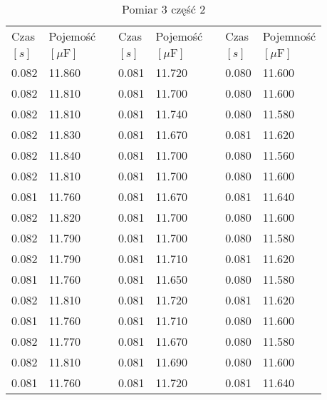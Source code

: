 \documentclass[12pt]{mwrep}
\begin{document}
	\begin{table}[H]\caption{Pomiar 3 część 2}\label{tab:3v2}
		\begin{tabularx}{\textwidth}{|Y|Y|p{2mm}|Y|Y|p{2mm}|Y|Y|}
			Czas & Pojemość && Czas & Pojemość && Czas & Pojemność \\
			$[s]$ & $[\mu\text{F}]$ && $[s]$ & $[\mu\text{F}]$ && $[s]$ & $[\mu\text{F}]$ \\
			0.082 & 11.860 && 0.081 & 11.720 && 0.080 & 11.600 \\
			0.082 & 11.810 && 0.081 & 11.700 && 0.080 & 11.600 \\
			0.082 & 11.810 && 0.081 & 11.740 && 0.080 & 11.580 \\
			0.082 & 11.830 && 0.081 & 11.670 && 0.081 & 11.620 \\
			0.082 & 11.840 && 0.081 & 11.700 && 0.080 & 11.560 \\
			0.082 & 11.810 && 0.081 & 11.700 && 0.080 & 11.600 \\
			0.081 & 11.760 && 0.081 & 11.670 && 0.081 & 11.640 \\
			0.082 & 11.820 && 0.081 & 11.700 && 0.080 & 11.600 \\
			0.082 & 11.790 && 0.081 & 11.700 && 0.080 & 11.580 \\
			0.082 & 11.790 && 0.081 & 11.710 && 0.081 & 11.620 \\
			0.081 & 11.760 && 0.081 & 11.650 && 0.080 & 11.580 \\
			0.082 & 11.810 && 0.081 & 11.720 && 0.081 & 11.620 \\
			0.081 & 11.760 && 0.081 & 11.710 && 0.080 & 11.600 \\
			0.082 & 11.770 && 0.081 & 11.670 && 0.080 & 11.580 \\
			0.082 & 11.810 && 0.081 & 11.690 && 0.080 & 11.600 \\
			0.081 & 11.760 && 0.081 & 11.720 && 0.081 & 11.640 \\

\end{tabularx}
\end{table}
\end{document}
